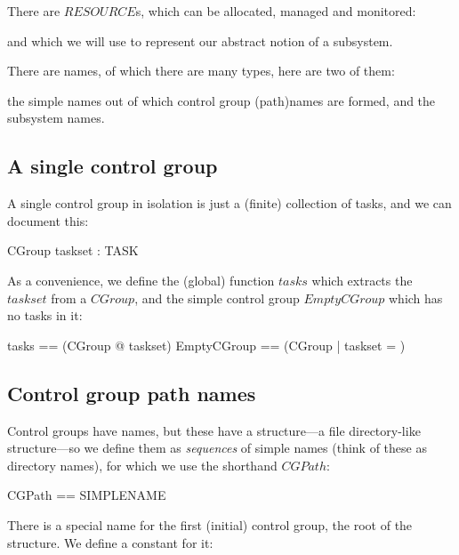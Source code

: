 \documentclass[a4paper,twoside,12pt]{article}
\begin{document}
There are $RESOURCE$s, which can be allocated, managed and monitored:
\begin{zed}
[RESOURCE]
\end{zed}
and which we will use to represent our abstract notion of a subsystem.

There are names, of which there are many types, here are two of them:
\begin{zed}
\end{zed}
the simple names out of which control group (path)names are formed, and the subsystem names.

\subsection{A single control group}

A single control group in isolation is just a (finite) collection of tasks, and we can document this:

\begin{schema}{CGroup}
taskset : \finset TASK
\end{schema}

As a convenience, we define the (global) function $tasks$ which extracts the $taskset$ from a $CGroup$, and the
simple control group $EmptyCGroup$ which has no tasks in it:
\begin{zed}
tasks == (\lambda CGroup @ taskset)
\also
EmptyCGroup == (\mu CGroup | taskset = \emptyset )
\end{zed}

\subsection{Control group path names}

Control groups have names, but these have a structure---a file directory-like structure---so we define them as \emph{sequences} of simple names (think of these as directory names), for which we use the shorthand $CGPath$:

\begin{zed}
CGPath == \seq SIMPLENAME
\end{zed}

There is a special name for the first (initial) control group, the root of the structure. We define a constant for it:
\end{document}
